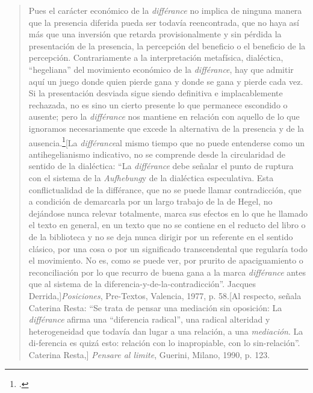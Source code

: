\begin{quote}
Pues el carácter económico de la \emph{différance} no implica de ninguna
manera que la presencia diferida pueda ser todavía reencontrada, que no
haya así más que una inversión que retarda provisionalmente y sin
pérdida la presentación de la presencia, la percepción del beneficio o
el beneficio de la percepción. Contrariamente a la interpretación
metafísica, dialéctica, ``hegeliana'' del movimiento económico de la
\emph{différance}, hay que admitir aquí un juego donde quien pierde gana
y donde se gana y pierde cada vez. Si la presentación desviada sigue
siendo definitiva e implacablemente rechazada, no es sino un cierto
presente lo que permanece escondido o ausente; pero la \emph{différance}
nos mantiene en relación con aquello de lo que ignoramos necesariamente
que excede la alternativa de la presencia y de la ausencia.\footcites[21]{derrida1989b}[La
  \emph{différance}al mismo tiempo que no puede entenderse como un
  antihegelianismo indicativo, no se comprende desde la circularidad de
  sentido de la dialéctica: \enquote{La \emph{différance} debe señalar el punto
  de ruptura con el sistema de la \emph{Aufhebung}y de la dialéctica
  especulativa. Esta conflictualidad de la différance, que no se puede
  llamar contradicción, que a condición de demarcarla por un largo
  trabajo de la de Hegel, no dejándose nunca relevar totalmente, marca
  sus efectos en lo que he llamado el texto en general, en un texto que
  no se contiene en el reducto del libro o de la biblioteca y no se deja
  nunca dirigir por un referente en el sentido clásico, por una cosa o
  por un significado transcendental que regularía todo el movimiento. No
  es, como se puede ver, por prurito de apaciguamiento o reconciliación
  por lo que recurro de buena gana a la marca \emph{différance}
  antes que al sistema de la diferencia-y-de-la-contradicción}. Jacques
  Derrida,]{\emph{Posiciones}, Pre-Textos, Valencia, 1977, p. 58.}[Al
  respecto, señala Caterina Resta: \enquote{Se trata de pensar una mediación sin
  oposición: La \emph{différance} afirma una ``diferencia radical'',
  una radical alteridad y heterogeneidad que todavía dan lugar a una
  relación, a una \emph{mediación}. La di-ferencia es quizá esto:
  relación con lo inapropiable, con lo sin-relación}. Caterina Resta,]
  {\emph{Pensare al limite}, Guerini, Milano, 1990, p. 123.}
\end{quote}

